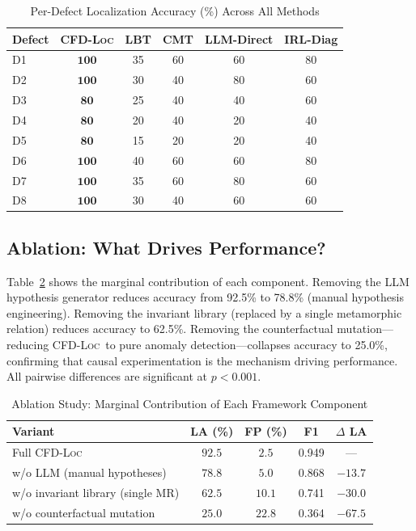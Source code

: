 \documentclass[journal]{IEEEtran}
\theoremstyle{plain}
\newcommand{\methodname}{\textsc{CFD-Loc}}
\begin{document}
\begin{table}[t]
\centering\small
\caption{Per-Defect Localization Accuracy (\%) Across All Methods}
\label{tab:per_defect}
\begin{tabular}{lccccc}
\toprule
\textbf{Defect} & \textbf{\methodname} & \textbf{LBT} & \textbf{CMT} & \textbf{LLM-Direct} & \textbf{IRL-Diag} \\\midrule
D1 & $\mathbf{100}$ & 35 & 60 & 60 & 80 \\
D2 & $\mathbf{100}$ & 30 & 40 & 80 & 60 \\
D3 & $\mathbf{80}$ & 25 & 40 & 40 & 60 \\
D4 & $\mathbf{80}$ & 20 & 40 & 20 & 40 \\
D5 & $\mathbf{80}$ & 15 & 20 & 20 & 40 \\
D6 & $\mathbf{100}$ & 40 & 60 & 60 & 80 \\
D7 & $\mathbf{100}$ & 35 & 60 & 80 & 60 \\
D8 & $\mathbf{100}$ & 30 & 40 & 60 & 60 \\
\bottomrule
\end{tabular}
\end{table}

\subsection{Ablation: What Drives Performance?}

Table~\ref{tab:ablation} shows the marginal contribution of each component. Removing the LLM hypothesis generator reduces accuracy from 92.5\% to 78.8\% (manual hypothesis engineering). Removing the invariant library (replaced by a single metamorphic relation) reduces accuracy to 62.5\%. Removing the counterfactual mutation---reducing \methodname\ to pure anomaly detection---collapses accuracy to 25.0\%, confirming that causal experimentation is the mechanism driving performance. All pairwise differences are significant at $p<0.001$.

\begin{table}[t]
\centering\small
\caption{Ablation Study: Marginal Contribution of Each Framework Component}
\label{tab:ablation}
\begin{tabular}{lcccc}
\toprule
\textbf{Variant} & \textbf{LA (\%)} & \textbf{FP (\%)} & \textbf{F1} & $\Delta$ LA \\\midrule
Full \methodname & $\mathbf{92.5}$ & $\mathbf{2.5}$ & 0.949 & --- \\
w/o LLM (manual hypotheses) & $78.8$ & $5.0$ & 0.868 & $-13.7$ \\
w/o invariant library (single MR) & $62.5$ & $10.1$ & 0.741 & $-30.0$ \\
w/o counterfactual mutation & $25.0$ & $22.8$ & 0.364 & $-67.5$ \\
\bottomrule
\end{tabular}
\end{table}
\end{document}
